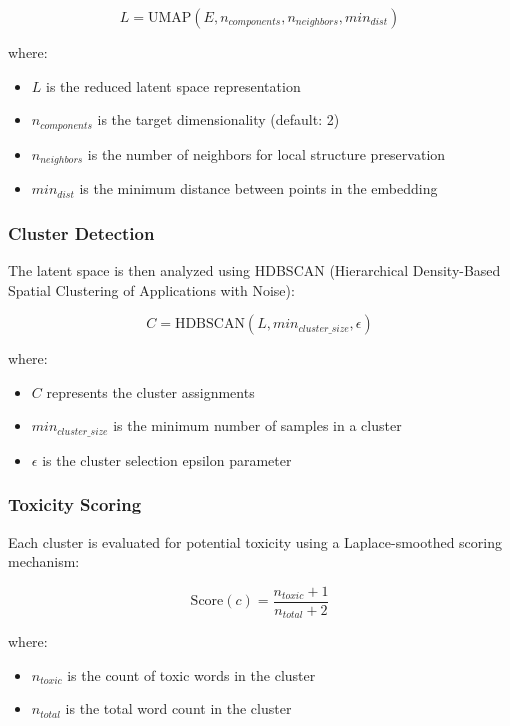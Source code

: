 \documentclass[12pt]{article}
\begin{document}
\begin{equation}
    L = \text{UMAP}(E, n_{components}, n_{neighbors}, min_{dist})
\end{equation}

where:
\begin{itemize}
    \item $L$ is the reduced latent space representation
    \item $n_{components}$ is the target dimensionality (default: 2)
    \item $n_{neighbors}$ is the number of neighbors for local structure preservation
    \item $min_{dist}$ is the minimum distance between points in the embedding
\end{itemize}

\subsubsection{Cluster Detection}

The latent space is then analyzed using HDBSCAN (Hierarchical Density-Based Spatial Clustering of Applications with Noise):

\begin{equation}
    C = \text{HDBSCAN}(L, min_{cluster\_size}, \epsilon)
\end{equation}

where:
\begin{itemize}
    \item $C$ represents the cluster assignments
    \item $min_{cluster\_size}$ is the minimum number of samples in a cluster
    \item $\epsilon$ is the cluster selection epsilon parameter
\end{itemize}

\subsubsection{Toxicity Scoring}

Each cluster is evaluated for potential toxicity using a Laplace-smoothed scoring mechanism:

\begin{equation}
    \text{Score}(c) = \frac{n_{toxic} + 1}{n_{total} + 2}
\end{equation}

where:
\begin{itemize}
    \item $n_{toxic}$ is the count of toxic words in the cluster
    \item $n_{total}$ is the total word count in the cluster
\end{itemize}
\end{document}
